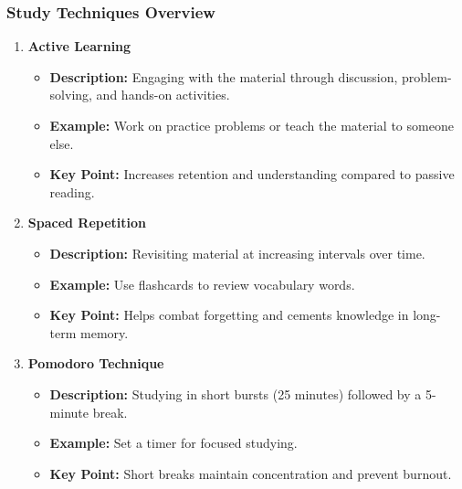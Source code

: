 \documentclass[aspectratio=169]{beamer}
\begin{document}
\begin{frame}[fragile]
    \frametitle{Study Techniques Overview}
    \begin{enumerate}
        \item \textbf{Active Learning}
            \begin{itemize}
                \item \textbf{Description:} Engaging with the material through discussion, problem-solving, and hands-on activities.
                \item \textbf{Example:} Work on practice problems or teach the material to someone else.
                \item \textbf{Key Point:} Increases retention and understanding compared to passive reading.
            \end{itemize}
        
        \item \textbf{Spaced Repetition}
            \begin{itemize}
                \item \textbf{Description:} Revisiting material at increasing intervals over time.
                \item \textbf{Example:} Use flashcards to review vocabulary words.
                \item \textbf{Key Point:} Helps combat forgetting and cements knowledge in long-term memory.
            \end{itemize}
        
        \item \textbf{Pomodoro Technique}
            \begin{itemize}
                \item \textbf{Description:} Studying in short bursts (25 minutes) followed by a 5-minute break.
                \item \textbf{Example:} Set a timer for focused studying.
                \item \textbf{Key Point:} Short breaks maintain concentration and prevent burnout.
            \end{itemize}
    \end{enumerate}
\end{frame}
\end{document}
